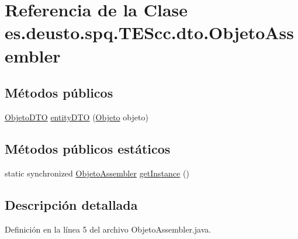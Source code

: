 \hypertarget{classes_1_1deusto_1_1spq_1_1_t_e_scc_1_1dto_1_1_objeto_assembler}{\section{Referencia de la Clase es.\+deusto.\+spq.\+T\+E\+Scc.\+dto.\+Objeto\+Assembler}
\label{classes_1_1deusto_1_1spq_1_1_t_e_scc_1_1dto_1_1_objeto_assembler}
}
\subsection*{Métodos públicos}
\begin{DoxyCompactItemize}
\item 
\hyperlink{classes_1_1deusto_1_1spq_1_1_t_e_scc_1_1dto_1_1_objeto_d_t_o}{Objeto\+D\+T\+O} \hyperlink{classes_1_1deusto_1_1spq_1_1_t_e_scc_1_1dto_1_1_objeto_assembler_a697a22d89a3c995deeb263d52084bfd4}{entity\+D\+T\+O} (\hyperlink{classes_1_1deusto_1_1spq_1_1_t_e_scc_1_1servidor_1_1jdo_1_1_objeto}{Objeto} objeto)
\end{DoxyCompactItemize}
\subsection*{Métodos públicos estáticos}
\begin{DoxyCompactItemize}
\item 
static synchronized \hyperlink{classes_1_1deusto_1_1spq_1_1_t_e_scc_1_1dto_1_1_objeto_assembler}{Objeto\+Assembler} \hyperlink{classes_1_1deusto_1_1spq_1_1_t_e_scc_1_1dto_1_1_objeto_assembler_a004d564c3feda259f0731c7cea55c67a}{get\+Instance} ()
\end{DoxyCompactItemize}


\subsection{Descripción detallada}


Definición en la línea 5 del archivo Objeto\+Assembler.\+java.



